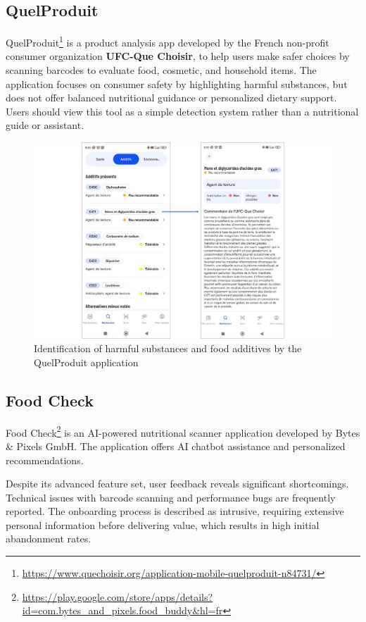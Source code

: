\subsection{QuelProduit}
QuelProduit\footnote{\url{https://www.quechoisir.org/application-mobile-quelproduit-n84731/}} is a product analysis app developed by the French non-profit consumer organization \textbf{UFC-Que Choisir}, to help users make safer choices by scanning barcodes to evaluate food, cosmetic, and household items.
 The application focuses on consumer safety by highlighting harmful substances, but does not offer balanced nutritional guidance or personalized dietary support. Users should view this tool as a simple detection system rather than a nutritional guide or assistant.

 \begin{center}
\begin{figure}[H]
\includegraphics[scale=0.33]{images/quelproduit.jpg}
\caption{Identification of harmful substances and food additives by the QuelProduit application}
\label{fig:queChoisir}
\end{figure}
\end{center}

 \subsection{Food Check}
Food Check\footnote{\url{https://play.google.com/store/apps/details?id=com.bytes_and_pixels.food_buddy&hl=fr}} is an AI-powered nutritional scanner application developed by Bytes \& Pixels GmbH. The application offers AI chatbot assistance and personalized recommendations.

Despite its advanced feature set, user feedback reveals significant shortcomings. Technical issues with barcode scanning and performance bugs are frequently reported. The onboarding process is described as intrusive, requiring extensive personal information before delivering value, which results in high initial abandonment rates.

